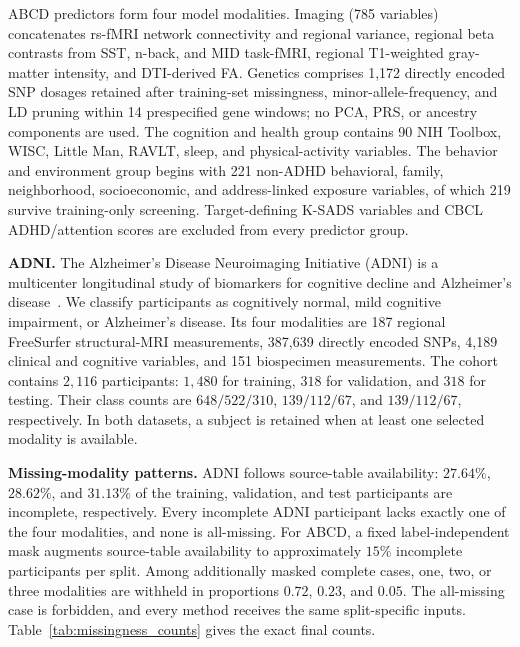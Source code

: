 \documentclass[a4paper,fleqn]{cas-dc}
\begin{document}
ABCD predictors form four model modalities. Imaging (785 variables) concatenates rs-fMRI network connectivity and regional variance, regional beta contrasts from SST, n-back, and MID task-fMRI, regional T1-weighted gray-matter intensity, and DTI-derived FA. Genetics comprises 1,172 directly encoded SNP dosages retained after training-set missingness, minor-allele-frequency, and LD pruning within 14 prespecified gene windows; no PCA, PRS, or ancestry components are used. The cognition and health group contains 90 NIH Toolbox, WISC, Little Man, RAVLT, sleep, and physical-activity variables. The behavior and environment group begins with 221 non-ADHD behavioral, family, neighborhood, socioeconomic, and address-linked exposure variables, of which 219 survive training-only screening. Target-defining K-SADS variables and CBCL ADHD/attention scores are excluded from every predictor group.

\noindent\textbf{ADNI.}
The Alzheimer's Disease Neuroimaging Initiative (ADNI) is a multicenter longitudinal study of biomarkers for cognitive decline and Alzheimer's disease~\cite{ref_adni}. We classify participants as cognitively normal, mild cognitive impairment, or Alzheimer's disease. Its four modalities are 187 regional FreeSurfer structural-MRI measurements, 387,639 directly encoded SNPs, 4,189 clinical and cognitive variables, and 151 biospecimen measurements. The cohort contains \(2{,}116\) participants: \(1{,}480\) for training, \(318\) for validation, and \(318\) for testing. Their class counts are \(648/522/310\), \(139/112/67\), and \(139/112/67\), respectively. In both datasets, a subject is retained when at least one selected modality is available.

\label{sec:missingness_protocol}

\noindent\textbf{Missing-modality patterns.}
ADNI follows source-table availability: \(27.64\%\), \(28.62\%\), and \(31.13\%\) of the training, validation, and test participants are incomplete, respectively. Every incomplete ADNI participant lacks exactly one of the four modalities, and none is all-missing. For ABCD, a fixed label-independent mask augments source-table availability to approximately \(15\%\) incomplete participants per split. Among additionally masked complete cases, one, two, or three modalities are withheld in proportions \(0.72\), \(0.23\), and \(0.05\). The all-missing case is forbidden, and every method receives the same split-specific inputs. Table~\ref{tab:missingness_counts} gives the exact final counts.
\end{document}
